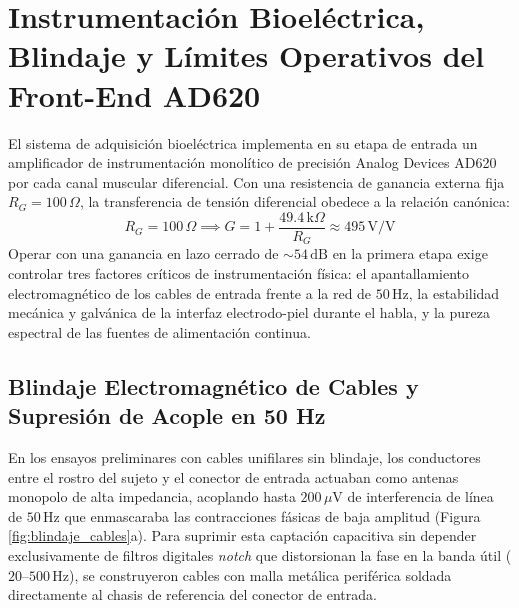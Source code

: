 \documentclass[11pt,a4paper]{article}
\begin{document}
\tableofcontents
\newpage

\section{Instrumentación Bioeléctrica, Blindaje y Límites Operativos del Front-End AD620}

El sistema de adquisición bioeléctrica implementa en su etapa de entrada un amplificador de instrumentación monolítico de precisión Analog Devices AD620 por cada canal muscular diferencial. Con una resistencia de ganancia externa fija $R_G = 100\,\Omega$, la transferencia de tensión diferencial obedece a la relación canónica:
\begin{equation}
    R_G = 100\,\Omega \implies G = 1 + \frac{49.4\,\text{k}\Omega}{R_G} \approx 495\,\text{V/V}
    \label{eq:ganancia_ad620}
\end{equation}
Operar con una ganancia en lazo cerrado de $\sim 54\,\text{dB}$ en la primera etapa exige controlar tres factores críticos de instrumentación física: el apantallamiento electromagnético de los cables de entrada frente a la red de $50\,\text{Hz}$, la estabilidad mecánica y galvánica de la interfaz electrodo-piel durante el habla, y la pureza espectral de las fuentes de alimentación continua.

\subsection{Blindaje Electromagnético de Cables y Supresión de Acople en 50 Hz}
En los ensayos preliminares con cables unifilares sin blindaje, los conductores entre el rostro del sujeto y el conector de entrada actuaban como antenas monopolo de alta impedancia, acoplando hasta $200\,\mu\text{V}$ de interferencia de línea de $50\,\text{Hz}$ que enmascaraba las contracciones fásicas de baja amplitud (Figura \ref{fig:blindaje_cables}a). Para suprimir esta captación capacitiva sin depender exclusivamente de filtros digitales \textit{notch} que distorsionan la fase en la banda útil ($20\text{--}500\,\text{Hz}$), se construyeron cables con malla metálica periférica soldada directamente al chasis de referencia del conector de entrada.
\end{document}
